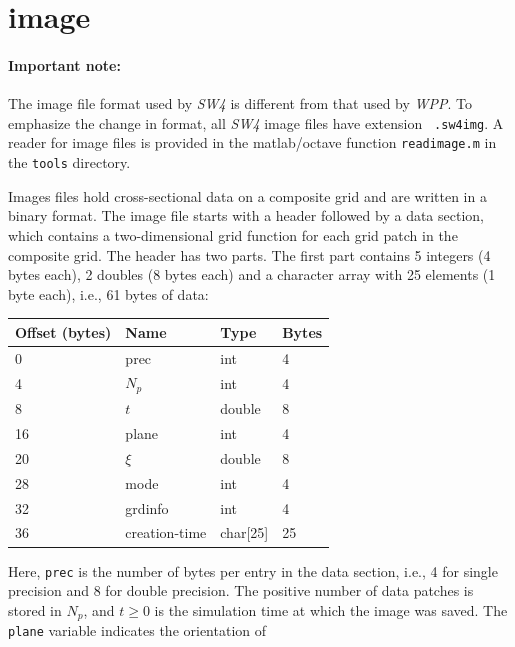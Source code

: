 \documentclass[11pt]{report}
\begin{document}
{\section{image}\label{sec:image-format}

\paragraph{Important note:} The image file format used by \emph{SW4} is different from that used by
\emph{WPP}. To emphasize the change in format, all \emph{SW4} image files have extension {\tt
		.sw4img}. A reader for image files is provided in the matlab/octave function \verb+readimage.m+ in
the \verb+tools+ directory.

Images files hold cross-sectional data on a composite grid and are written in a binary format. The
image file starts with a header followed by a data section, which contains a two-dimensional grid
function for each grid patch in the composite grid. The header has two parts. The first part
contains 5 integers (4 bytes each), 2 doubles (8 bytes each) and a character array with 25 elements
(1 byte each), i.e., 61 bytes of data:
\begin{center}
	\begin{tabular}{llll}\hline
		Offset (bytes) & Name          & Type     & Bytes \\ \hline
		0              & prec          & int      & 4     \\ \hline
		4              & $N_p$         & int      & 4     \\ \hline
		8              & $t$           & double   & 8     \\ \hline
		16             & plane         & int      & 4     \\ \hline
		20             & $\xi$         & double   & 8     \\ \hline
		28             & mode          & int      & 4     \\ \hline
		32             & grdinfo       & int      & 4     \\ \hline
		36             & creation-time & char[25] & 25    \\ \hline
	\end{tabular}
\end{center}
Here, {\tt prec} is the number of bytes per entry in the data section, i.e., 4 for single precision
and 8 for double precision. The positive number of data patches is stored in $N_p$, and $t\geq 0$ is the
simulation time at which the image was saved. The {\tt plane} variable indicates the orientation of
}
\end{document}

